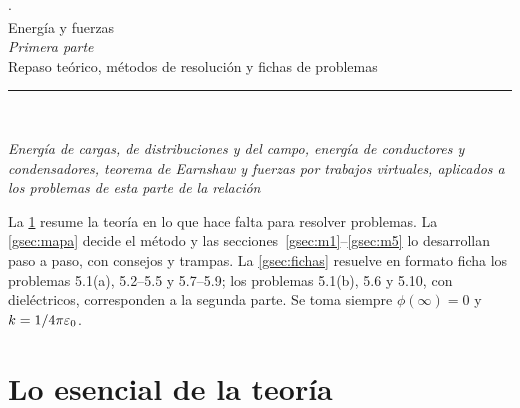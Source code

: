 \thispagestyle{plain}
\newcommand{\ficha}[3]{\par\addvspace{1.1em}\needspace{5\baselineskip}\noindent{\color{acentoA}\bfseries Problema #1.\ #2}\hfill
  {\small\sffamily\color{acentoC}#3}\par\nopagebreak\smallskip}

\begin{center}
  {\small\color{tenue}\quad$\cdot$\quad{}}\\[1.0em]
  {\fuentetitulo\fontsize{22}{26}\selectfont Energía y fuerzas}\\[0.3em]
  {\itshape Primera parte}\\[0.5em]
  {\large Repaso teórico, métodos de resolución y fichas de problemas}\\[0.8em]
  {\color{acentoA}\rule{2.6cm}{0.6pt}}\\[0.8em]
  \begin{minipage}{0.86\textwidth}\centering\small\itshape
  Energía de cargas, de distribuciones y del campo, energía de conductores y condensadores, teorema de
  Earnshaw y fuerzas por trabajos virtuales, aplicados a los problemas de esta parte de la relación
  \end{minipage}
\end{center}

\begin{consejo}
La \cref{gsec:teoria} resume la teoría en lo que hace falta para resolver problemas. La \cref{gsec:mapa} decide el método y las
secciones~\ref{gsec:m1}--\ref{gsec:m5} lo desarrollan paso a paso, con consejos y trampas. La \cref{gsec:fichas} resuelve en formato
ficha los problemas 5.1(a), 5.2--5.5 y 5.7--5.9; los problemas 5.1(b), 5.6 y 5.10, con dieléctricos, corresponden a la segunda parte. Se toma
siempre $\phi(\infty)=0$ y $k=1/4\pi\varepsilon_0$.
\end{consejo}

{\small\tableofcontents}
\newpage

\section{Lo esencial de la teoría}\label{gsec:teoria}

